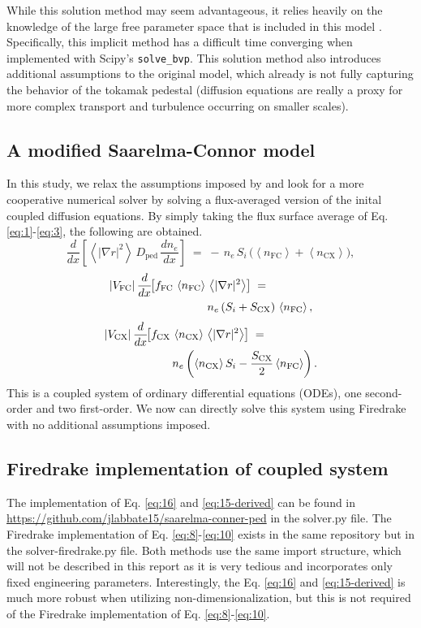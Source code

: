 \documentclass[twocolumn,secnumarabic,amssymb, nobibnotes, aps, prd]{revtex4-2}
\renewcommand{\ne}{n_{e}}  %
\newcommand{\nfc}{n_{\mathrm{FC}}}
\newcommand{\ncx}{n_{\mathrm{CX}}}
\newcommand{\Vfc}{\lvert V_{\mathrm{FC}}\rvert}
\newcommand{\Vcx}{\lvert V_{\mathrm{CX}}\rvert}
\newcommand{\Si}{S_{i}}
\newcommand{\Scx}{S_{\mathrm{CX}}}
\newcommand{\Dped}{D_{\mathrm{ped}}}
\newcommand{\fFC}{f_{\mathrm{FC}}}
\newcommand{\fCX}{f_{\mathrm{CX}}}
\newcommand{\fsa}[1]{\left\langle #1 \right\rangle}
\newcommand{\gradrsq}{\fsa{|\nabla r|^{2}}}
\begin{document}
While this solution method may seem advantageous, it relies heavily on the knowledge of the large free parameter space that is included in this model \cite{JohnLabbate}.
Specifically, this implicit method has a difficult time converging when implemented with Scipy's \texttt{solve\_bvp}.
This solution method also introduces additional assumptions to the original model, which already is not fully capturing the behavior of the tokamak pedestal (diffusion equations are really a proxy for more complex transport and turbulence occurring on smaller scales).

\subsection{A modified Saarelma-Connor model}
In this study, we relax the assumptions imposed by \cite{saarelma2023testing} and look for a more cooperative numerical solver by solving a flux-averaged version of the inital coupled diffusion equations.
By simply taking the flux surface average of Eq. \ref{eq:1}-\ref{eq:3}, the following are obtained.
\begin{equation}
  \frac{d}{dx}\!\left[\gradrsq\,\Dped\,\frac{d\ne}{dx}\right]
    \;=\; -\,\ne\,\Si\,\bigl(\fsa{\nfc}+\fsa{\ncx}\bigr),
  \label{eq:8}
\end{equation}
\begin{align}
  \Vfc\,\frac{d}{dx}\!\bigl[\fFC\,\fsa{\nfc}\,&\gradrsq\bigr]
    \;=\; 
    \notag \\ &\ne\,(\Si+\Scx)\,\fsa{\nfc},
      \label{eq:9}
\end{align}
\begin{align}
  \Vcx\,\frac{d}{dx}\!\bigl[\fCX\,&\fsa{\ncx}\,\gradrsq\bigr]
    \;=\; 
    \notag \\ &\ne\left(\fsa{\ncx}\Si - \frac{\Scx}{2}\fsa\nfc\right).
      \label{eq:10}
\end{align}
This is a coupled system of ordinary differential equations (ODEs), one second-order and two first-order.
We now can directly solve this system using Firedrake with no additional assumptions imposed.

\subsection{Firedrake implementation of coupled system}
The implementation of Eq. \ref{eq:16} and \ref{eq:15-derived} can be found in \url{https://github.com/jlabbate15/saarelma-conner-ped} in the solver.py file. 
The Firedrake implementation of Eq. \ref{eq:8}-\ref{eq:10} exists in the same repository but in the solver-firedrake.py file.
Both methods use the same import structure, which will not be described in this report as it is very tedious and incorporates only fixed engineering parameters.
Interestingly, the Eq. \ref{eq:16} and \ref{eq:15-derived} is much more robust when utilizing non-dimensionalization, but this is not required of the Firedrake implementation of Eq. \ref{eq:8}-\ref{eq:10}.
\end{document}
